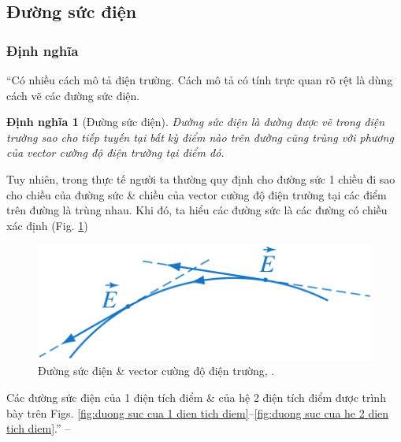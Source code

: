 \documentclass[oneside]{book}
\numberwithin{equation}{section}
\newtheorem{dinhnghia}{Định nghĩa}[section]
\begin{document}
\subsection{Đường sức điện}

\subsubsection{Định nghĩa}
``Có nhiều cách mô tả điện trường. Cách mô tả có tính trực quan rõ rệt là dùng cách vẽ các đường sức điện.

\begin{dinhnghia}[Đường sức điện]
	\emph{Đường sức điện} là đường được vẽ trong điện trường sao cho tiếp tuyến tại bất kỳ điểm nào trên đường cũng trùng với phương của vector cường độ điện trường tại điểm đó.
\end{dinhnghia}
Tuy nhiên, trong thực tế người ta thường quy định cho đường sức 1 chiều đi sao cho chiều của đường sức \& chiều của vector cường độ điện trường tại các điểm trên đường là trùng nhau. Khi đó, ta hiểu các đường sức là các đường có chiều xác định (Fig. \ref{fig:duong suc dien})

\begin{figure}[H]
	\centering
	\includegraphics[scale=0.15]{duong_suc_dien}
	\caption{Đường sức điện \& vector cường độ điện trường, \cite[Hình 3.2, p. 15]{SGK_Vat_Ly_11_nang_cao}.}
	\label{fig:duong suc dien}
\end{figure}
Các đường sức điện của 1 điện tích điểm \& của hệ 2 điện tích điểm được trình bày trên Figs. \ref{fig:duong suc cua 1 dien tich diem}--\ref{fig:duong suc cua he 2 dien tich diem}.'' --  \cite[pp. 14--15]{SGK_Vat_Ly_11_nang_cao}
\end{document}
